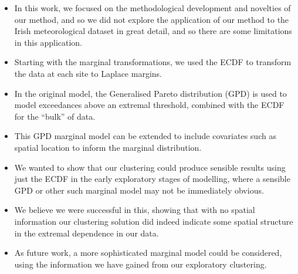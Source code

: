 \documentclass{article}
\numberwithin{equation}{section}
\begin{document}
\begin{itemize}
  \item In this work, we focused on the methodological development and novelties of our method, and so we did not explore the application of our method to the Irish meteorological dataset in great detail, and so there are some limitations in this application.
  \item Starting with the marginal transformations, we used the ECDF to transform the data at each site to Laplace margins.
  \item In the original \citet{Heffernan2004} model, the Generalised Pareto distribution (GPD) is used to model exceedances above an extremal threshold, combined with the ECDF for the ``bulk'' of data. 
  \item This GPD marginal model can be extended to include covariates such as spatial location to inform the marginal distribution.
  \item We wanted to show that our clustering could produce sensible results using just the ECDF in the early exploratory stages of modelling, where a sensible GPD or other such marginal model may not be immediately obvious.
  \item We believe we were successful in this, showing that with no spatial information our clustering solution did indeed indicate some spatial structure in the extremal dependence in our data.
  \item As future work, a more sophisticated marginal model could be considered, using the information we have gained from our exploratory clustering. 
\end{itemize}

\vspace{1cm}
\end{document}
